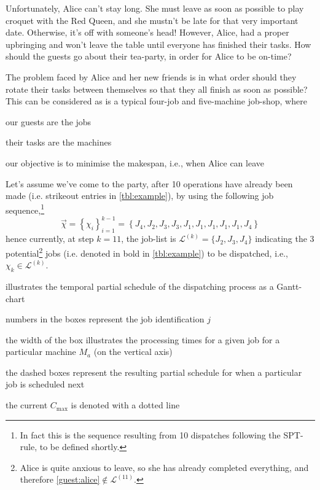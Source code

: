 

Unfortunately, Alice can't stay long. She must leave as soon as possible to 
play croquet with the Red Queen, 
and she mustn't be late for that very important date. Otherwise, it's off with 
someone's head! However, Alice, had a proper upbringing and won't leave the 
table until everyone has finished their tasks. 
How should the guests go about their tea-party, in order for Alice to be 
on-time?

The problem faced by Alice and her new friends is in what order should they 
rotate their tasks between themselves so that they all finish as soon as 
possible? This can be considered as is a typical four-job and five-machine 
job-shop, where
\begin{enumerate*}[label={{}}]
    \item our guests are the jobs
    \item their tasks are the machines
    \item our objective is to minimise the makespan, i.e., when Alice can leave
\end{enumerate*}

Let's assume we've come to the party, after 10 operations have already been 
made (i.e. strikeout entries in \cref{tbl:example}), by using the following 
job sequence,\footnote{In fact this is the sequence resulting from 10 
    dispatches following the SPT-rule, to be defined shortly.}
\begin{equation}
\vec{\chi} = \left\{ \chi_i \right\}_{i=1}^{k-1}
           = \left\{ J_4,J_2,J_3,J_3,J_1,J_1,J_1,J_1,J_1,J_4 \right\}
\end{equation}
hence currently, at step $k=11$, the job-list is 
$\mathcal{L}^{(k)}=\{J_2,J_3,J_4\}$ indicating the 3 potential\footnote{
    Alice is quite anxious to leave, so she has already completed everything, 
    and therefore \ref{guest:alice}$\notin\mathcal{L}^{(11)}$.} 
jobs (i.e. denoted in bold in \cref{tbl:example}) to be dispatched, i.e., 
$\chi_k\in\mathcal{L}^{(k)}$.

 illustrates the temporal partial schedule of the 
dispatching process as a Gantt-chart
\begin{enumerate*}
    \item numbers in the boxes represent the job identification $j$
    \item the width of the box illustrates the processing times for a given job 
    for a particular machine $M_a$ (on the vertical axis)
    \item the dashed boxes represent the resulting partial schedule for when a 
    particular job is scheduled next 
    \item the current $C_{\max}$ is denoted with a dotted line    
\end{enumerate*}

